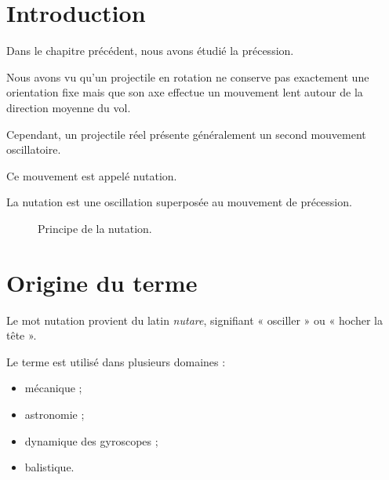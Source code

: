 
\section{Introduction}

Dans le chapitre précédent, nous avons étudié la précession.

Nous avons vu qu'un projectile en rotation ne conserve pas exactement une
orientation fixe mais que son axe effectue un mouvement lent autour de la
direction moyenne du vol.

Cependant, un projectile réel présente généralement un second mouvement
oscillatoire.

Ce mouvement est appelé nutation.

\begin{aretenir}

La nutation est une oscillation superposée au mouvement de précession.

\end{aretenir}

\begin{figure}[htbp]
\centering
{}
\caption{Principe de la nutation.}
\label{fig:nutation}
\end{figure}

\section{Origine du terme}

Le mot nutation provient du latin \emph{nutare}, signifiant « osciller » ou
« hocher la tête ».

Le terme est utilisé dans plusieurs domaines :

\begin{itemize}
    \item mécanique ;
    \item astronomie ;
    \item dynamique des gyroscopes ;
    \item balistique.
\end{itemize}

